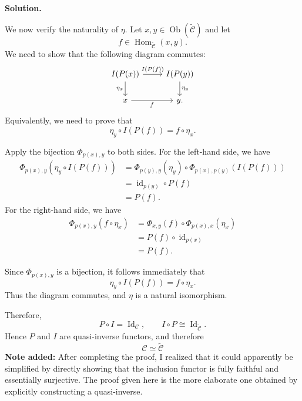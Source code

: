 \documentclass[11pt,a4paper]{article}
\newcounter{problem}
\newcounter{saveequation}
\newenvironment{solution}
{
	\par
	\setcounter{saveequation}{\value{equation}}
	\begingroup
	\setcounter{equation}{0}
	\renewcommand{\theequation}{\arabic{problem}.\arabic{equation}}
	\renewcommand{\theHequation}{sol.\arabic{problem}.\arabic{equation}}
	\noindent\textbf{Solution.}\quad
}
{
	\par
	\endgroup
	\setcounter{equation}{\value{saveequation}}
}
\begin{document}
\begin{solution}
		We now verify the naturality of \(\eta\). Let
		\(x,y\in\operatorname{Ob}(\widetilde{\mathcal C})\) and let
		\[
		f\in\operatorname{Hom}_{\widetilde{\mathcal C}}(x,y).
		\]
		We need to show that the following diagram commutes:
		\[
		\begin{tikzcd}
			I(P(x))
			\arrow[r,"I(P(f))"]
			\arrow[d,"\eta_x"']
			&
			I(P(y))
			\arrow[d,"\eta_y"]
			\\
			x
			\arrow[r,"f"']
			&
			y.
		\end{tikzcd}
		\]
		Equivalently, we need to prove that
		\[
		\eta_y\circ I(P(f))
		=
		f\circ\eta_x.
		\]
		
		Apply the bijection \(\Phi_{p(x),y}\) to both sides. For the left-hand
		side, we have
		\[
		\begin{aligned}
			\Phi_{p(x),y}
			\left(
			\eta_y\circ I(P(f))
			\right)
			&=
			\Phi_{p(y),y}(\eta_y)
			\circ
			\Phi_{p(x),p(y)}
			\left(
			I(P(f))
			\right)
			\\
			&=
			\operatorname{id}_{p(y)}
			\circ P(f)
			\\
			&=
			P(f).
		\end{aligned}
		\]
		For the right-hand side, we have
		\[
		\begin{aligned}
			\Phi_{p(x),y}
			\left(
			f\circ\eta_x
			\right)
			&=
			\Phi_{x,y}(f)
			\circ
			\Phi_{p(x),x}(\eta_x)
			\\
			&=
			P(f)
			\circ
			\operatorname{id}_{p(x)}
			\\
			&=
			P(f).
		\end{aligned}
		\]
		
		Since \(\Phi_{p(x),y}\) is a bijection, it follows immediately that
		\[
		\eta_y\circ I(P(f))
		=
		f\circ\eta_x.
		\]
		Thus the diagram commutes, and \(\eta\) is a natural isomorphism.
		
		Therefore,
		\[
		P\circ I
		=
		\operatorname{Id}_{\mathcal C},
		\qquad
		I\circ P
		\cong
		\operatorname{Id}_{\widetilde{\mathcal C}}.
		\]
		Hence \(P\) and \(I\) are quasi-inverse functors, and therefore
		\[
		\boxed{
			\mathcal C\simeq\widetilde{\mathcal C}
		}
		\]
		\textbf{Note added:} After completing the proof, I realized that it could apparently be simplified by directly showing that the inclusion functor is fully faithful and essentially surjective. The proof given here is the more elaborate one obtained by explicitly constructing a quasi-inverse.
		
	\end{solution}
	
\end{document}
